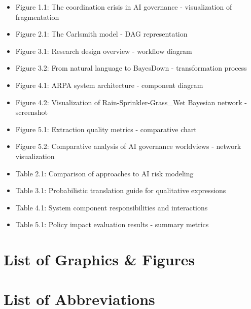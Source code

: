 \documentclass[
  11pt,
  letterpaper,
]{book}
\providecommand{\tightlist}{%
  \setlength{\itemsep}{0pt}\setlength{\parskip}{0pt}}
\begin{document}
\begin{itemize}
\tightlist
\item
  Figure 1.1: The coordination crisis in AI governance - visualization
  of fragmentation\\
\item
  Figure 2.1: The Carlsmith model - DAG representation\\
\item
  Figure 3.1: Research design overview - workflow diagram\\
\item
  Figure 3.2: From natural language to BayesDown - transformation
  process\\
\item
  Figure 4.1: ARPA system architecture - component diagram\\
\item
  Figure 4.2: Visualization of Rain-Sprinkler-Grass\_Wet Bayesian
  network - screenshot\\
\item
  Figure 5.1: Extraction quality metrics - comparative chart\\
\item
  Figure 5.2: Comparative analysis of AI governance worldviews - network
  visualization\\
\item
  Table 2.1: Comparison of approaches to AI risk modeling\\
\item
  Table 3.1: Probabilistic translation guide for qualitative
  expressions\\
\item
  Table 4.1: System component responsibilities and interactions\\
\item
  Table 5.1: Policy impact evaluation results - summary metrics
\end{itemize}

\section*{List of Graphics \& Figures}\label{list-of-graphics-figures}


\section*{List of Abbreviations}\label{list-of-abbreviations}
\end{document}
